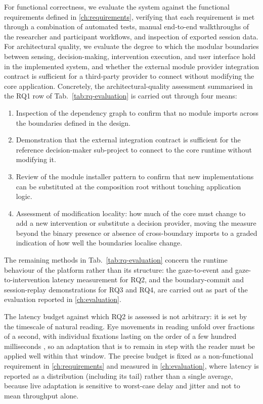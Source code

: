 For functional correctness, we evaluate the system against the functional requirements defined in \cref{ch:requirements}, verifying that each requirement is met through a combination of automated tests, manual end-to-end walkthroughs of the researcher and participant workflows, and inspection of exported session data.
For architectural quality, we evaluate the degree to which the modular boundaries between sensing, decision-making, intervention execution, and user interface hold in the implemented system, and whether the external module provider integration contract is sufficient for a third-party provider to connect without modifying the core application.
Concretely, the architectural-quality assessment summarised in the RQ1 row of Tab.~\ref{tab:rq-evaluation} is carried out through four means:
\begin{enumerate}
  \item Inspection of the dependency graph to confirm that no module imports across the boundaries defined in the design.
  \item Demonstration that the external integration contract is sufficient for the reference decision-maker sub-project to connect to the core runtime without modifying it.
  \item Review of the module installer pattern to confirm that new implementations can be substituted at the composition root without touching application logic.
  \item Assessment of modification locality: how much of the core must change to add a new intervention or substitute a decision provider, moving the measure beyond the binary presence or absence of cross-boundary imports to a graded indication of how well the boundaries localise change.
\end{enumerate}

The remaining methods in Tab.~\ref{tab:rq-evaluation} concern the runtime behaviour of the platform rather than its structure: the gaze-to-event and gaze-to-intervention latency measurement for RQ2, and the boundary-commit and session-replay demonstrations for RQ3 and RQ4, are carried out as part of the evaluation reported in \cref{ch:evaluation}.

The latency budget against which RQ2 is assessed is not arbitrary: it is set by the timescale of natural reading.
Eye movements in reading unfold over fractions of a second, with individual fixations lasting on the order of a few hundred milliseconds \cite{rayner1998eyemovements}, so an adaptation that is to remain in step with the reader must be applied well within that window.
The precise budget is fixed as a non-functional requirement in \cref{ch:requirements} and measured in \cref{ch:evaluation}, where latency is reported as a distribution (including its tail) rather than a single average, because live adaptation is sensitive to worst-case delay and jitter and not to mean throughput alone.

